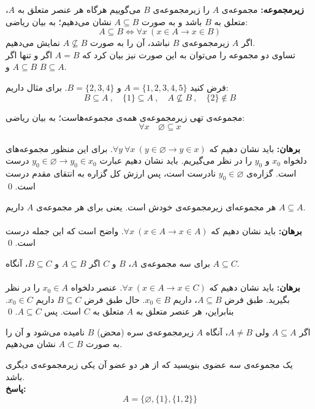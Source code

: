 \textbf{زیرمجموعه:}
مجموعه‌ی $A$ را زیرمجموعه‌ی $B$ می‌گوییم هرگاه هر عنصر متعلق به $A$، متعلق به $B$ باشد و به صورت
$A \subseteq B$
نشان می‌دهیم؛ به بیان ریاضی:
$$A \subseteq B  \iff \forall x \ (x \in A \rightarrow x \in B)$$
اگر $A$ زیرمجموعه‌ی $B$ نباشد، آن را به صورت
$A \nsubseteq B$
نمایش می‌دهیم. \\
تساوی دو مجموعه را می‌توان به این صورت نیز بیان کرد که
$A=B$
اگر و تنها اگر
$A \subseteq B$ و $B \subseteq A$.
\begin{example}
	فرض کنید
	$A=\{1,2,3,4,5\}$ و $B=\{2,3,4\}$.
	برای مثال داریم:
	$$B \subseteq A \ , \quad \{1\} \subseteq A \ , \quad A \nsubseteq B \ , \quad \{2\} \notin B$$
\end{example}
\begin{theorem}
	مجموعه‌ی تهی زیرمجموعه‌ی همه‌ی مجموعه‌هاست؛ به بیان ریاضی:
	$$\forall x \quad \varnothing \subseteq x$$
	\dfth \\ \textbf{برهان:}
	باید نشان دهیم که
	$\forall y \ \forall x \ (y \in \varnothing \rightarrow y \in x)$.
	برای این منظور مجموعه‌های دلخواه
	$x_0$ و $y_0$
	را در نظر می‌گیریم. باید نشان دهیم عبارت
	$y_0 \in \varnothing \rightarrow y_0 \in x_0$
	درست است. گزاره‌ی
	$y_0 \in \varnothing$
	نادرست است، پس ارزش کل گزاره به انتقای مقدم درست است.
	\qed
\end{theorem}
\begin{theorem}
	هر مجموعه‌ای زیرمجموعه‌ی خودش است. یعنی برای هر مجموعه‌ی $A$ داریم
	$A \subseteq A$.
	\\ \dfth \\ \textbf{برهان:}
	باید نشان دهیم که
	$\forall x \ (x \in A \rightarrow x \in A)$.
	واضح است که این جمله درست است.
	\qed
\end{theorem}
\begin{theorem}
	برای سه مجموعه‌ی $A$، $B$ و $C$ اگر
	$A \subseteq B$ و $B \subseteq C$،
	آنگاه
	$A \subseteq C$.
	\\ \dfth \\ \textbf{برهان:}
	باید نشان دهیم که
	$\forall x \ (x \in A \rightarrow x \in C)$.
	عنصر دلخواه
	$x_0 \in A$
	را در نظر بگیرید. طبق فرض
	$A \subseteq B$،
	داریم
	$x_0 \in B$.
	حال طبق فرض
	$B \subseteq C$
	داریم
	$x_0 \in C$.
	بنابراین، هر عنصر متعلق به $A$ متعلق به $C$ است. پس
	$A \subseteq C$.
	\qed
\end{theorem}
\smallskip
اگر
$A \subseteq A$
ولی
$A \neq B$،
آنگاه $A$ زیرمجموعه‌ی سره (محض) $B$ نامیده می‌شود و آن را به صورت
$A \subset B$
نشان می‌دهیم.
\begin{example}
	یک مجموعه‌ی سه عضوی بنویسید که از هر دو عضو آن یکی زیرمجموعه‌ی دیگری باشد.
	\\ \textbf{پاسخ:}
	$$A = \{\varnothing, \{1\}, \{1,2\}\}$$
\end{example}
